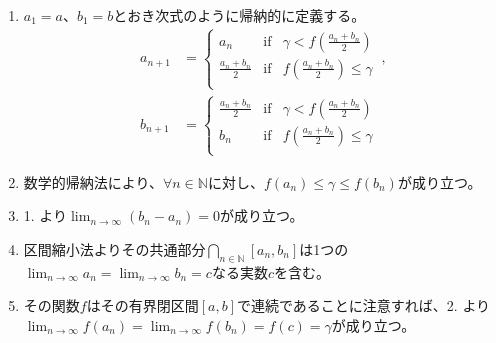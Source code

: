 \documentclass[dvipdfmx]{jsarticle}
\begin{document}
\begin{enumerate}
\item
  $a_{1} = a$、$b_{1} = b$とおき次式のように帰納的に定義する。
\begin{align*}
a_{n + 1} &= \left\{ \begin{matrix}
a_{n} & \mathrm{if} & \gamma < f\left( \frac{a_{n} + b_{n}}{2} \right) \\
\frac{a_{n} + b_{n}}{2} & \mathrm{if} & f\left( \frac{a_{n} + b_{n}}{2} \right) \leq \gamma \\
\end{matrix} \right.\ ,\\
b_{n + 1} &= \left\{ \begin{matrix}
\frac{a_{n} + b_{n}}{2} & \mathrm{if} & \gamma < f\left( \frac{a_{n} + b_{n}}{2} \right) \\
b_{n} & \mathrm{if} & f\left( \frac{a_{n} + b_{n}}{2} \right) \leq \gamma \\
\end{matrix} \right.\ 
\end{align*}
\item
  数学的帰納法により、$\forall n \in \mathbb{N}$に対し、$f\left( a_{n} \right) \leq \gamma \leq f\left( b_{n} \right)$が成り立つ。
\item
  1. より$\lim_{n \rightarrow \infty}\left( b_{n} - a_{n} \right) = 0$が成り立つ。
\item
  区間縮小法よりその共通部分$\bigcap_{n \in \mathbb{N}} \left[ a_{n},b_{n} \right]$は1つの$\lim_{n \rightarrow \infty}a_{n} = \lim_{n \rightarrow \infty}b_{n} = c$なる実数$c$を含む。
\item
  その関数$f$はその有界閉区間$[ a,b]$で連続であることに注意すれば、2. より$\lim_{n \rightarrow \infty}{f\left( a_{n} \right)} = \lim_{n \rightarrow \infty}{f\left( b_{n} \right)} = f(c) = \gamma$が成り立つ。
\end{enumerate}
\end{document}
